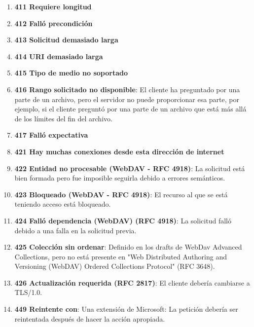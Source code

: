 \begin{enumerate}
\item \textbf{411 Requiere longitud}
\item \textbf{412 Falló precondición}
\item \textbf{413 Solicitud demasiado larga}
\item \textbf{414 URI demasiado larga}
\item \textbf{415 Tipo de medio no soportado}
\item \textbf{416 Rango solicitado no disponible}: El cliente ha preguntado por una parte de un archivo, pero el servidor no puede proporcionar esa parte, por ejemplo, si el cliente preguntó por una parte de un archivo que está más allá de los límites del fin del archivo.
\item \textbf{417 Falló expectativa}
\item \textbf{421 Hay muchas conexiones desde esta dirección de internet}
\item \textbf{422 Entidad no procesable (WebDAV - RFC 4918)}: La solicitud está bien formada pero fue imposible seguirla debido a errores semánticos.
\item \textbf{423 Bloqueado (WebDAV - RFC 4918)}: El recurso al que se está teniendo acceso está bloqueado.
\item \textbf{424 Falló dependencia (WebDAV) (RFC 4918)}: La solicitud falló debido a una falla en la solicitud previa.
\item \textbf{425 Colección sin ordenar}: Definido en los drafts de WebDav Advanced Collections, pero no está presente en "Web Distributed Authoring and Versioning (WebDAV) Ordered Collections Protocol" (RFC 3648).
\item \textbf{426 Actualización requerida (RFC 2817)}: El cliente debería cambiarse a TLS/1.0.
\item \textbf{449 Reintente con}: Una extensión de Microsoft: La petición debería ser reintentada después de hacer la acción apropiada.
\end{enumerate}

